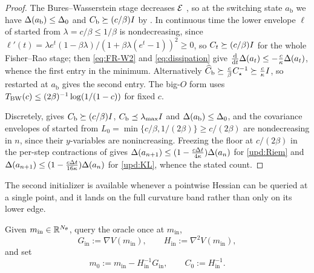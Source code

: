 \begin{proof}
    The Bures--Wasserstein stage decreases $\mathcal{E}$ \citep{lambert2022variational}, so at the
    switching state $a_{\mathrm b}$ we have $\Delta(a_{\mathrm b})\leq\Delta_0$ and
    $C_{\mathrm b}\succeq(c/\beta)I$ by . In continuous time the lower
    envelope $\ell$ of  started from $\lambda=c/\beta\leq1/\beta$ is
    nondecreasing, since
    $\ell'(t)=\lambda e^t(1-\beta\lambda)/(1+\beta\lambda(e^t-1))^2\geq0$, so
    $C_t\succeq(c/\beta)I$ for the whole Fisher--Rao stage; then \eqref{eq:FR-W2} and
    \eqref{eq:dissipation} give
    $\tfrac{\mathrm{d}}{\mathrm{d} t}\Delta(a_t)\leq-\tfrac c\kappa\Delta(a_t)$, whence the first entry in
    the minimum. Alternatively
    $\widehat C_{\mathrm b}\succeq\tfrac c\beta C_\star^{-1}\succeq\tfrac c\kappa I$, so
     restarted at $a_{\mathrm b}$ gives the second entry. The big-$O$ form
    uses $T_{\mathrm{BW}}(c)\leq(2\beta)^{-1}\log(1/(1-c))$ for fixed $c$.

    Discretely,  gives $C_{\mathrm b}\succeq(c/\beta)I$,
    $C_{\mathrm b}\preceq\lambda_{\max}I$ and $\Delta(a_{\mathrm b})\leq\Delta_0$, and the
    covariance envelopes of  started from
    $L_0=\min\{c/\beta,1/(2\beta)\}\geq c/(2\beta)$ are nondecreasing in $n$, since their
    $y$-variables are nonincreasing. Freezing the floor at $c/(2\beta)$ in the per-step
    contractions of  gives
    $\Delta(a_{n+1})\leq(1-\tfrac{c\Delta t}{4\kappa})\Delta(a_n)$ for \eqref{upd:Riem} and
    $\Delta(a_{n+1})\leq(1-\tfrac{c\Delta t}{16\kappa})\Delta(a_n)$ for \eqref{upd:KL},
    whence the stated count.
\end{proof}

The second initializer is available whenever a pointwise Hessian can be queried at a single
point, and it lands on the full curvature band rather than only on its lower edge.

\begin{definition}\label{def:rescue}
    Given $m_{\mathrm{in}}\in\mathbb{R}^{N_\theta}$, query the oracle once at $m_{\mathrm{in}}$,
    \begin{equation*}
        G_{\mathrm{in}}:=\nabla V(m_{\mathrm{in}}),
        \qquad
        H_{\mathrm{in}}:=\nabla^2V(m_{\mathrm{in}}),
    \end{equation*}
    and set
    \begin{equation*}
        \boxed{\;
        m_0:=m_{\mathrm{in}}-H_{\mathrm{in}}^{-1}G_{\mathrm{in}},
        \qquad
        C_0:=H_{\mathrm{in}}^{-1}.\;}
    \end{equation*}
\end{definition}

